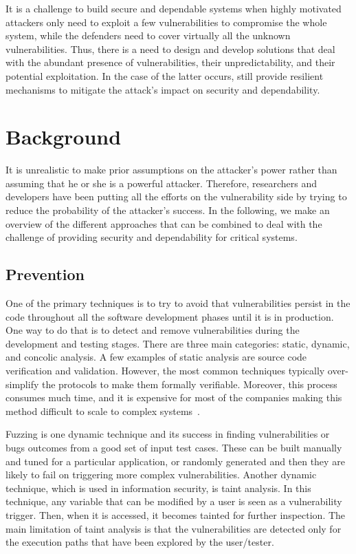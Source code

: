 It is a challenge to build secure and dependable systems when highly motivated attackers only need to exploit a few vulnerabilities to compromise the whole system, while the defenders need to cover virtually all the unknown vulnerabilities. 
Thus, there is a need to design and develop solutions that deal with the abundant presence of vulnerabilities, their unpredictability, and their potential exploitation.
In the case of the latter occurs, still provide resilient mechanisms to mitigate the attack's impact on security and dependability.


\section{Background}
\label{sec:background}

It is unrealistic to make prior assumptions on the attacker's power rather than assuming that he or she is a powerful attacker.
Therefore, researchers and developers have been putting all the efforts on the vulnerability side by trying to reduce the probability of the attacker's success. 
In the following, we make an overview of the different approaches that can be combined to deal with the challenge of providing security and dependability for critical systems.

\subsection*{Prevention}
One of the primary techniques is to try to avoid that vulnerabilities persist in the code throughout all the software development phases until it is in production. 
One way to do that is to detect and remove vulnerabilities during the development and testing stages.
There are three main categories: static, dynamic, and concolic analysis.
A few examples of static analysis are source code verification and validation. 
However, the most common techniques typically over-simplify the protocols to make them formally verifiable. 
Moreover, this process consumes much time, and it is expensive for most of the companies making this method difficult to scale to complex systems~\cite{Giuffrida:2013}.

Fuzzing is one dynamic technique and its success in finding vulnerabilities or bugs outcomes from a good set of input test cases.
These can be built manually and tuned for a particular application, or randomly generated and then they are likely to fail on triggering more complex vulnerabilities.
Another dynamic technique, which is used in information security, is taint analysis.
In this technique, any variable that can be modified by a user is seen as a vulnerability trigger. 
Then, when it is accessed, it becomes tainted for further inspection.
The main limitation of taint analysis is that the vulnerabilities are detected only for the execution paths that have been explored by the user/tester.

